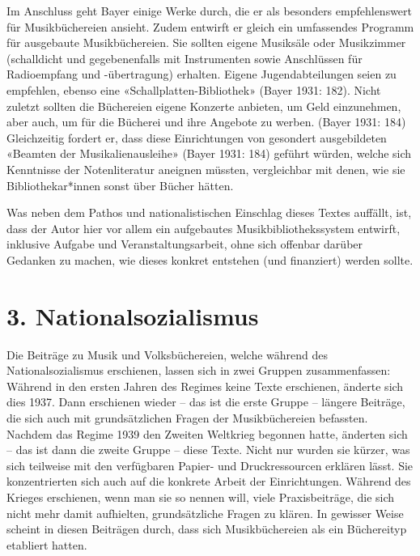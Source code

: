 \documentclass[a4paper,
fontsize=11pt,
oneside,
numbers=noperiodatend,
parskip=half-,
bibliography=totoc,
final
]{scrartcl}
\begin{document}
Im Anschluss geht Bayer einige Werke durch, die er als besonders
empfehlenswert für Musikbüchereien ansieht. Zudem entwirft er gleich ein
umfassendes Programm für ausgebaute Musikbüchereien. Sie sollten eigene
Musiksäle oder Musikzimmer (schalldicht und gegebenenfalls mit
Instrumenten sowie Anschlüssen für Radioempfang und -übertragung)
erhalten. Eigene Jugendabteilungen seien zu empfehlen, ebenso eine
«Schallplatten-Bibliothek» (Bayer 1931: 182). Nicht zuletzt sollten die
Büchereien eigene Konzerte anbieten, um Geld einzunehmen, aber auch, um
für die Bücherei und ihre Angebote zu werben. (Bayer 1931: 184)
Gleichzeitig fordert er, dass diese Einrichtungen von gesondert
ausgebildeten «Beamten der Musikalienausleihe» (Bayer 1931: 184) geführt
würden, welche sich Kenntnisse der Notenliteratur aneignen müssten,
vergleichbar mit denen, wie sie Bibliothekar*innen sonst über Bücher
hätten.

Was neben dem Pathos und nationalistischen Einschlag dieses Textes
auffällt, ist, dass der Autor hier vor allem ein aufgebautes
Musikbibliothekssystem entwirft, inklusive Aufgabe und
Veranstaltungsarbeit, ohne sich offenbar darüber Gedanken zu machen, wie
dieses konkret entstehen (und finanziert) werden sollte.

\hypertarget{nationalsozialismus}{%
\section{3. Nationalsozialismus}\label{nationalsozialismus}}

Die Beiträge zu Musik und Volksbüchereien, welche während des
Nationalsozialismus erschienen, lassen sich in zwei Gruppen
zusammenfassen: Während in den ersten Jahren des Regimes keine Texte
erschienen, änderte sich dies 1937. Dann erschienen wieder -- das ist
die erste Gruppe -- längere Beiträge, die sich auch mit grundsätzlichen
Fragen der Musikbüchereien befassten. Nachdem das Regime 1939 den
Zweiten Weltkrieg begonnen hatte, änderten sich -- das ist dann die
zweite Gruppe -- diese Texte. Nicht nur wurden sie kürzer, was sich
teilweise mit den verfügbaren Papier- und Druckressourcen erklären
lässt. Sie konzentrierten sich auch auf die konkrete Arbeit der
Einrichtungen. Während des Krieges erschienen, wenn man sie so nennen
will, viele Praxisbeiträge, die sich nicht mehr damit aufhielten,
grundsätzliche Fragen zu klären. In gewisser Weise scheint in diesen
Beiträgen durch, dass sich Musikbüchereien als ein Büchereityp etabliert
hatten.
\end{document}
